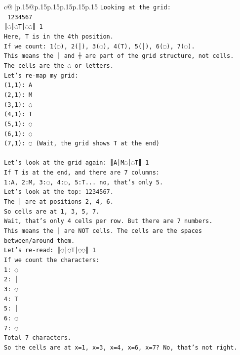 \documentclass{article}
\begin{document}
{\begin{supertabular}{c@{$\;$}|p{.15\linewidth}@{}p{.15\linewidth}p{.15\linewidth}p{.15\linewidth}p{.15\linewidth}p{.15\linewidth}}
{{{\texttt{Looking at the grid:} \\
\texttt{ 1234567} \\
\texttt{║◌│◌T│◌◌║ 1} \\
\texttt{Here, T is in the 4th position.} \\
\texttt{If we count: 1(◌), 2(│), 3(◌), 4(T), 5(│), 6(◌), 7(◌).} \\
\texttt{This means the │ and ┼ are part of the grid structure, not cells.} \\
\texttt{The cells are the ◌ or letters.} \\
\texttt{Let's re{-}map my grid:} \\
\texttt{(1,1): A} \\
\texttt{(2,1): M} \\
\texttt{(3,1): ◌} \\
\texttt{(4,1): T} \\
\texttt{(5,1): ◌} \\
\texttt{(6,1): ◌} \\
\texttt{(7,1): ◌ (Wait, the grid shows T at the end)} \\
\\ 
\texttt{Let's look at the grid again: ║A│M◌│◌T║ 1} \\
\texttt{If T is at the end, and there are 7 columns:} \\
\texttt{1:A, 2:M, 3:◌, 4:◌, 5:T... no, that's only 5.} \\
\texttt{Let's look at the top:  1234567.} \\
\texttt{The │ are at positions 2, 4, 6.} \\
\texttt{So cells are at 1, 3, 5, 7.} \\
\texttt{Wait, that's only 4 cells per row. But there are 7 numbers.} \\
\texttt{This means the │ are NOT cells. The cells are the spaces between/around them.} \\
\texttt{Let's re{-}read: ║◌│◌T│◌◌║ 1} \\
\texttt{If we count the characters:} \\
\texttt{1: ◌} \\
\texttt{2: │} \\
\texttt{3: ◌} \\
\texttt{4: T} \\
\texttt{5: │} \\
\texttt{6: ◌} \\
\texttt{7: ◌} \\
\texttt{Total 7 characters.} \\
\texttt{So the cells are at x=1, x=3, x=4, x=6, x=7? No, that's not right.} \\
}}}
\end{supertabular}}
\end{document}
